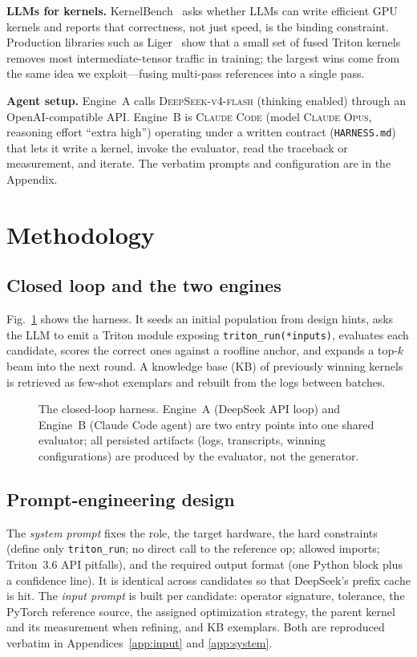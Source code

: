 \documentclass[conference]{IEEEtran}
\begin{document}
\textbf{LLMs for kernels.} KernelBench~\cite{ouyang2025kernelbench} asks whether
LLMs can write efficient GPU kernels and reports that correctness, not just
speed, is the binding constraint. Production libraries such as
Liger~\cite{hsu2024liger} show that a small set of fused Triton kernels removes
most intermediate-tensor traffic in training; the largest wins come from the same
idea we exploit---fusing multi-pass references into a single pass.

\textbf{Agent setup.} Engine~A calls \textsc{DeepSeek-v4-flash} (thinking
enabled) through an OpenAI-compatible API. Engine~B is \textsc{Claude Code}
(model \textsc{Claude Opus}, reasoning effort ``extra high'') operating under a
written contract (\texttt{HARNESS.md}) that lets it write a kernel, invoke the
evaluator, read the traceback or measurement, and iterate. The verbatim prompts
and configuration are in the Appendix.

\section{Methodology}
\subsection{Closed loop and the two engines}
Fig.~\ref{fig:pipeline} shows the harness. It seeds an initial population from
design hints, asks the LLM to emit a Triton module exposing
\texttt{triton\_run(*inputs)}, evaluates each candidate, scores the correct ones
against a roofline anchor, and expands a top-$k$ beam into the next round. A
knowledge base (KB) of previously winning kernels is retrieved as few-shot
exemplars and rebuilt from the logs between batches.

\begin{figure}[t]
  \centering
  \resizebox{0.95\textwidth}{!}{}
  \caption{The closed-loop harness. Engine~A (DeepSeek API loop) and Engine~B
  (Claude Code agent) are two entry points into one shared evaluator; all
  persisted artifacts (logs, transcripts, winning configurations) are produced by
  the evaluator, not the generator.}
  \label{fig:pipeline}
\end{figure}

\subsection{Prompt-engineering design}
The \emph{system prompt} fixes the role, the target hardware, the hard
constraints (define only \texttt{triton\_run}; no direct call to the reference
op; allowed imports; Triton~3.6 API pitfalls), and the required output format
(one Python block plus a confidence line). It is identical across candidates so
that DeepSeek's prefix cache is hit. The \emph{input prompt} is built per
candidate: operator signature, tolerance, the PyTorch reference source, the
assigned optimization strategy, the parent kernel and its measurement when
refining, and KB exemplars. Both are reproduced verbatim in
Appendices~\ref{app:input} and \ref{app:system}.
\end{document}
